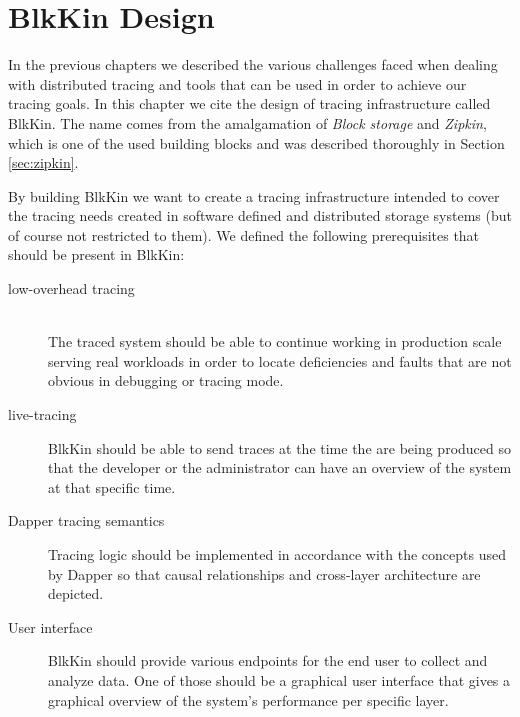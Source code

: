 \chapter{BlkKin Design}\label{ch:design}

In the previous chapters we described the various challenges faced when dealing
with distributed tracing and tools that can be used in order to achieve our
tracing goals. In this chapter we cite the design of tracing infrastructure
called BlkKin. The name comes from the amalgamation of \textit{Block storage}
and \textit{Zipkin}, which is one of the used building blocks and was described
thoroughly in Section \ref{sec:zipkin}.

By building BlkKin we want to create a tracing infrastructure intended to cover
the tracing needs created in software defined and distributed storage systems
(but of course not restricted to them). We defined the following prerequisites
that should be present in BlkKin:

\begin{description}

\item[low-overhead tracing] \hfill \\
The traced system should be able to continue working in production scale serving
real workloads in order to locate deficiencies and faults that are not obvious
in debugging or tracing mode.

\item[live-tracing]
BlkKin should be able to send traces at the time the are being produced so that
the developer or the administrator can have an overview of the system at that
specific time.

\item[Dapper tracing semantics]
Tracing logic should be implemented in accordance with the concepts used by
Dapper so that causal relationships and cross-layer architecture are depicted.

\item[User interface]
BlkKin should provide various endpoints for the end user to collect and analyze
data. One of those should be a graphical user interface that gives a graphical
overview of the system's performance per specific layer.

\end{description}
